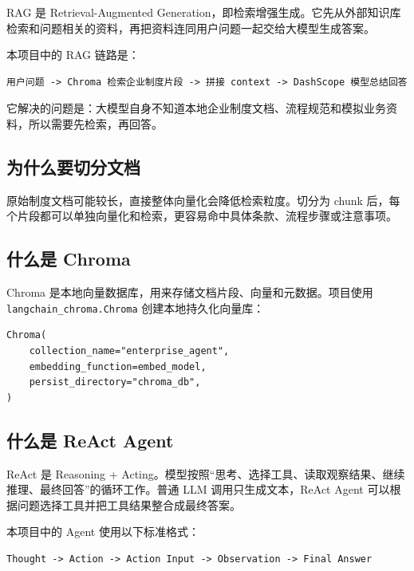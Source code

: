 \documentclass[UTF8,zihao=-4]{ctexart}
\begin{document}
RAG 是 Retrieval-Augmented Generation，即检索增强生成。它先从外部知识库检索和问题相关的资料，再把资料连同用户问题一起交给大模型生成答案。

本项目中的 RAG 链路是：

\begin{Verbatim}[breaklines=true,breakanywhere=true,fontsize=\small]
用户问题 -> Chroma 检索企业制度片段 -> 拼接 context -> DashScope 模型总结回答
\end{Verbatim}

它解决的问题是：大模型自身不知道本地企业制度文档、流程规范和模拟业务资料，所以需要先检索，再回答。

\subsection{为什么要切分文档}

原始制度文档可能较长，直接整体向量化会降低检索粒度。切分为 chunk 后，每个片段都可以单独向量化和检索，更容易命中具体条款、流程步骤或注意事项。

\subsection{什么是 Chroma}

Chroma 是本地向量数据库，用来存储文档片段、向量和元数据。项目使用 \texttt{langchain\_chroma.Chroma} 创建本地持久化向量库：

\begin{Verbatim}[breaklines=true,breakanywhere=true,fontsize=\small]
Chroma(
    collection_name="enterprise_agent",
    embedding_function=embed_model,
    persist_directory="chroma_db",
)
\end{Verbatim}

\subsection{什么是 ReAct Agent}

ReAct 是 Reasoning + Acting。模型按照“思考、选择工具、读取观察结果、继续推理、最终回答”的循环工作。普通 LLM 调用只生成文本，ReAct Agent 可以根据问题选择工具并把工具结果整合成最终答案。

本项目中的 Agent 使用以下标准格式：

\begin{Verbatim}[breaklines=true,breakanywhere=true,fontsize=\small]
Thought -> Action -> Action Input -> Observation -> Final Answer
\end{Verbatim}
\end{document}
